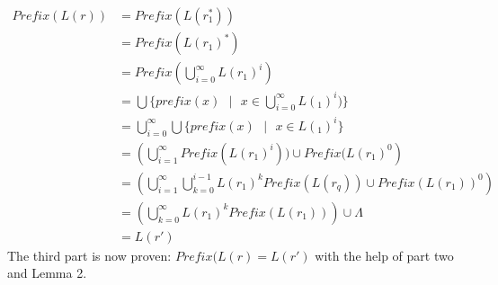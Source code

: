\documentclass{article}
\begin{document}
    \begin{align*}
        Prefix(L(r)) &= Prefix(L(r_1^*)) \\
            &= Prefix(L(r_1)^*) \\
            &= Prefix \left( \bigcup^{\infty}_{i=0}L(r_1)^i \right) \\
            &= \bigcup\{prefix(x) \text{ } | \text{ } x \in \bigcup^{\infty}_{i=0}L(_1)^i)\} \\
            &= \bigcup^{\infty}_{i=0} \bigcup\{prefix(x) \text{ } | \text{ } x \in L(_1)^i\} \\
            &= \left( \bigcup^{\infty}_{i=1}Prefix(L(r_1)^i)) \cup Prefix(L(r_1)^0 \right) \\
            &= \left( \bigcup^{\infty}_{i=1}\bigcup^{i-1}_{k=0}L(r_1)^kPrefix(L(r_q)) \cup Prefix(L(r_1))^0 \right)\\
            &= \left( \bigcup^{\infty}_{k=0}L(r_1)^kPrefix(L(r_1))\right) \cup \Lambda\\
            &= L(r')
    \end{align*}
The third part is now proven: $ Prefix(L(r)=L(r') $ with the help of part two and Lemma 2.
\end{document}
